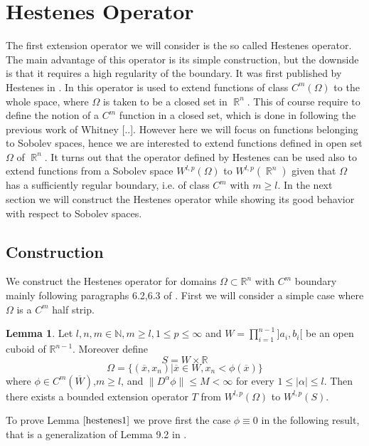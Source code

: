 \documentclass[12pt]{article}
\theoremstyle{definition}
\newtheorem{lemma}{Lemma}
\DeclareMathOperator\rr{\mathbb{R}}
\begin{document}
\section{Hestenes Operator}
The first extension operator we will consider is the so called Hestenes operator. The main advantage of this operator is its simple construction, but the downside is that it requires a high regularity of the boundary. It was first published by Hestenes in \cite{fraenkel}. In \cite{fraenkel} this operator is used to extend functions of class $C^m(\Omega)$ to the whole space, where $\Omega$ is taken to be a closed set in $\rr^n$. This of course require to define the notion of a $C^m$ function in a closed set, which is done in \cite{fraenkel} following the previous work of Whitney [..]. However here we will focus on functions belonging to Sobolev spaces, hence we are interested to extend functions defined in open set $\Omega$ of $\rr^n.$ It turns out that the operator defined by Hestenes can be used also to extend functions from a Sobolev space $W^{l,p}(\Omega)$ to $W^{l,p}(\rr^n)$ given that $\Omega$ has a sufficiently regular boundary, i.e. of class $C^m$ with $m\ge l$. In the next section we will construct the Hestenes operator while showing its good behavior with respect to Sobolev spaces.

\subsection{Construction}
We construct the Hestenes operator for domains  $\Omega \subset \mathbb{R}^n$ with $C^m$ boundary mainly following paragraphs 6.2,6.3 of \cite{burenkov}. First we will consider a simple case where $\Omega$ is a $C^m$ half strip. 
\begin{lemma}\label{hestenes1}
Let $l,n,m \in \mathbb{N}, m\ge l, 1\le p \le \infty$ and $W = \prod\limits_{i=1}^{n-1}]a_i,b_i[$ be an open cuboid of $\mathbb{R}^{n-1}$. Moreover define
\[ S=W \times \mathbb{R} \]
\[\Omega =\{ (\overline x,x_n) | \overline x\in W, x_n<\phi(\overline x)  \} \]
where $\phi \in C^m(\overline W)$,$m\ge l$, and $\| D^{\alpha}\phi \|\le M <\infty $ for every $1\le|\alpha|\le l$. Then there exists a bounded extension operator $T$ from $W^{l,p}(\Omega)$ to $W^{l,p}(S).$
\end{lemma}





To prove Lemma $\ref{hestenes1}$ we prove first the case $\phi \equiv 0$ in the following result, that is a generalization of Lemma 9.2 in \cite{brezis}.
\end{document}
